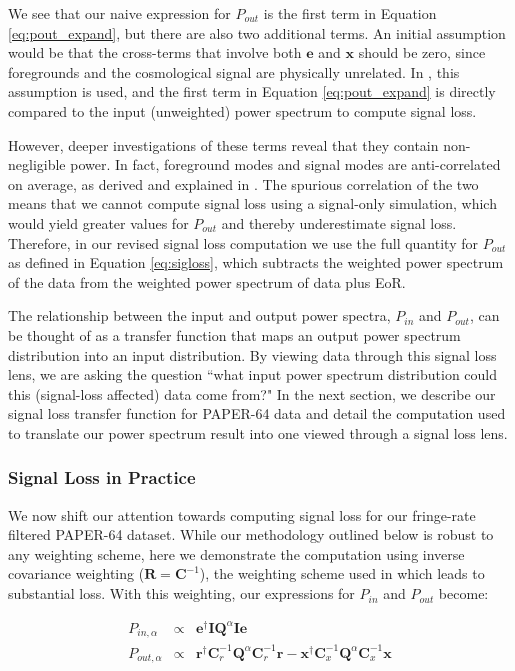 \documentclass[preprint2,numberedappendix,tighten]{aastex6}  %
\begin{document}
We see that our naive expression for $P_{out}$ is the first term in Equation \eqref{eq:pout_expand}, but there are also two additional terms. An initial assumption would be that the cross-terms that involve both $\textbf{e}$ and $\textbf{x}$ should be zero, since foregrounds and the cosmological signal are physically unrelated. In \citet{ali_et_al2015}, this assumption is used, and the first term in Equation \eqref{eq:pout_expand} is directly compared to the input (unweighted) power spectrum to compute signal loss.

However, deeper investigations of these terms reveal that they contain non-negligible power. In fact, foreground modes and signal modes are anti-correlated on average, as derived and explained in \citet{switzer_et_al2015}. The spurious correlation of the two means that we cannot compute signal loss using a signal-only simulation, which would yield greater values for $P_{out}$ and thereby underestimate signal loss. Therefore, in our revised signal loss computation we use the full quantity for $P_{out}$ as defined in Equation \eqref{eq:sigloss}, which subtracts the weighted power spectrum of the data from the weighted power spectrum of data plus EoR. 

The relationship between the input and output power spectra, $P_{in}$ and $P_{out}$, can be thought of as a transfer function that maps an output power spectrum distribution into an input distribution. By viewing data through this signal loss lens, we are asking the question ``what input power spectrum distribution could this (signal-loss affected) data come from?" In the next section, we describe our signal loss transfer function for PAPER-64 data and detail the computation used to translate our power spectrum result into one viewed through a signal loss lens.

\subsubsection{Signal Loss in Practice}

We now shift our attention towards computing signal loss for our fringe-rate filtered PAPER-64 dataset. While our methodology outlined below is robust to any weighting scheme, here we demonstrate the computation using inverse covariance weighting ($\textbf{R} = \textbf{C}^{-1}$), the weighting scheme used in \citet{ali_et_al2015} which leads to substantial loss. With this weighting, our expressions for $P_{in}$ and $P_{out}$ become:

\begin{eqnarray}
P_{in,\alpha} &\propto& \textbf{e}^{\dagger}\textbf{I}\textbf{Q}^{\alpha}\textbf{I}\textbf{e} \\
P_{out,\alpha} &\propto& \textbf{r}^{\dagger}\textbf{C}_{r}^{-1}\textbf{Q}^{\alpha}\textbf{C}_{r}^{-1}\textbf{r} - \textbf{x}^{\dagger}\textbf{C}_{x}^{-1}\textbf{Q}^{\alpha}\textbf{C}_{x}^{-1}\textbf{x} 
\end{eqnarray}
\end{document}
